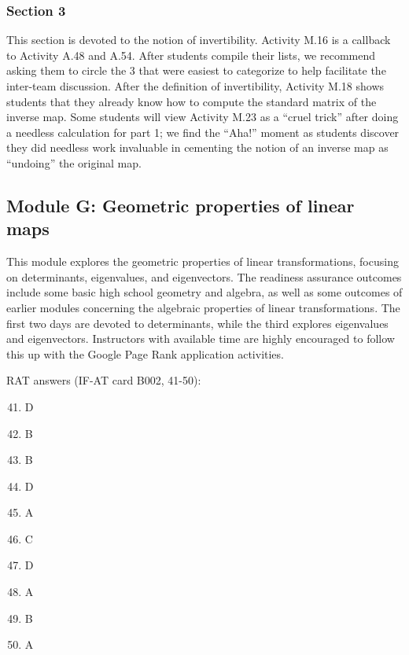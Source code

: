 \documentclass{article}
\begin{document}
\subsubsection*{Section 3}
This section is devoted to the notion of invertibility.  Activity M.16 is a callback to Activity A.48 and A.54.  After students compile their lists, we recommend asking them to circle the 3 that were easiest to categorize to help facilitate the inter-team discussion.   After the definition of invertibility, Activity M.18 shows students that they already know how to compute the standard matrix of the inverse map.  Some students will view Activity M.23 as a ``cruel trick'' after doing a needless calculation for part 1; we find the ``Aha!'' moment as students discover they did needless work invaluable in cementing the notion of an inverse map as ``undoing'' the original map.

\subsection*{Module G: Geometric properties of linear maps}

This module explores the geometric properties of linear transformations, focusing on determinants, eigenvalues, and eigenvectors.  The readiness assurance outcomes include some basic high school geometry and algebra, as well as some outcomes of earlier modules concerning the algebraic properties of linear transformations.  The first two days are devoted to determinants, while the third explores eigenvalues and eigenvectors.  Instructors with available time are highly encouraged to follow this up with the Google Page Rank application activities.

RAT answers (IF-AT card B002, 41-50):
\begin{multicols}{10}
\begin{enumerate}[1)]
\setcounter{enumi}{40}
\item D
\item B
\item B
\item D
\item A
\item C
\item D
\item A
\item B
\item A
\end{enumerate}
\end{multicols}
\end{document}
